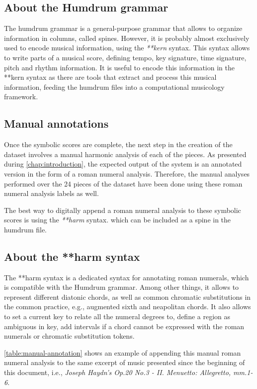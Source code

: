 \subsection{About the Humdrum grammar}
The humdrum grammar is a general-purpose grammar that allows to organize information in columns, called spines. However, it is probably almost exclusively used to encode musical information, using the \emph{**kern} syntax. This syntax allows to write parts of a musical score, defining tempo, key signature, time signature, pitch and rhythm information. It is useful to encode this information in the **kern syntax as there are tools that extract and process this musical information, feeding the humdrum files into a computational musicology framework.

\subsection{Manual annotations}
Once the symbolic scores are complete, the next step in the creation of the dataset involves a manual harmonic analysis of each of the pieces. As presented during \autoref{chap:introduction}, the expected output of the system is an annotated version in the form of a roman numeral analysis. Therefore, the manual analyses performed over the 24 pieces of the dataset have been done using these roman numeral analysis labels as well.

The best way to digitally append a roman numeral analysis to these symbolic scores is using the \emph{**harm} \cite{harm} syntax. which can be included as a spine in the humdrum file.

 \subsection{About the **harm syntax}
 The **harm syntax is a dedicated syntax for annotating roman numerals, which is compatible with the Humdrum grammar. Among other things, it allows to represent different diatonic chords, as well as common chromatic substitutions in the common practice, e.g., augmented sixth and neapolitan chords. It also allows to set a current key to relate all the numeral degrees to, define a region as ambiguous in key, add intervals if a chord cannot be expressed with the roman numerals or chromatic substitution tokens.



\autoref{table:manual-annotation} shows an example of appending this manual roman numeral analysis to the same excerpt of music presented since the beginning of this document, i.e., \emph{Joseph Haydn's Op.20 No.3 - II. Menuetto: Allegretto, mm.1-6}.

